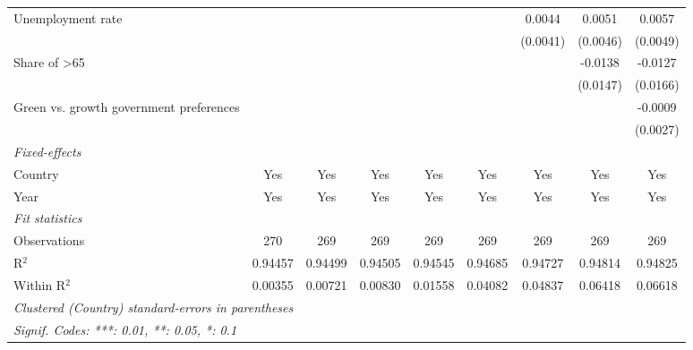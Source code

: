 \begin{table}[htbp]
\begin{tabular}{lcccccccc}
      Unemployment rate                                                  &          &          &          &          &          & 0.0044   & 0.0051   & 0.0057\\   
                                                                         &          &          &          &          &          & (0.0041) & (0.0046) & (0.0049)\\   
      Share of >65                                                       &          &          &          &          &          &          & -0.0138  & -0.0127\\   
                                                                         &          &          &          &          &          &          & (0.0147) & (0.0166)\\   
      Green vs. growth government preferences                            &          &          &          &          &          &          &          & -0.0009\\   
                                                                         &          &          &          &          &          &          &          & (0.0027)\\   
      \midrule
      \emph{Fixed-effects}\\
      Country                                                            & Yes      & Yes      & Yes      & Yes      & Yes      & Yes      & Yes      & Yes\\  
      Year                                                               & Yes      & Yes      & Yes      & Yes      & Yes      & Yes      & Yes      & Yes\\  
      \midrule
      \emph{Fit statistics}\\
      Observations                                                       & 270      & 269      & 269      & 269      & 269      & 269      & 269      & 269\\  
      R$^2$                                                              & 0.94457  & 0.94499  & 0.94505  & 0.94545  & 0.94685  & 0.94727  & 0.94814  & 0.94825\\  
      Within R$^2$                                                       & 0.00355  & 0.00721  & 0.00830  & 0.01558  & 0.04082  & 0.04837  & 0.06418  & 0.06618\\  
      \midrule \midrule
      \multicolumn{9}{l}{\emph{Clustered (Country) standard-errors in parentheses}}\\
      \multicolumn{9}{l}{\emph{Signif. Codes: ***: 0.01, **: 0.05, *: 0.1}}\\
   \end{tabular}
\end{table}


